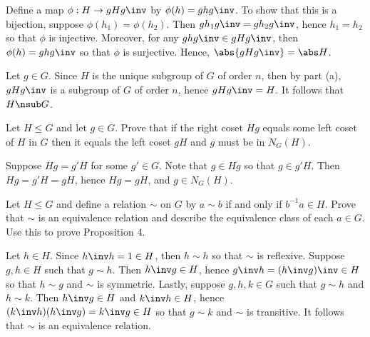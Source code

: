 \begin{problems}
\begin{solalph}
        Define a map $\phi : H \to gHg\inv$ by $\phi(h) = ghg\inv$. To show that this is a bijection, suppose $\phi(h_1) = \phi(h_2)$. Then $gh_1g\inv = gh_2g\inv$, hence $h_1 = h_2$ so that $\phi$ is injective. Moreover, for any $ghg\inv \in gHg\inv$, then $\phi(h) = ghg\inv$ so that $\phi$ is surjective. Hence, $\abs{gHg\inv} = \abs H$.
        \item Let $g \in G$. Since $H$ is the unique subgroup of $G$ of order $n$, then by part (a), $gHg\inv$ is a subgroup of $G$ of order $n$, hence $gHg\inv = H$. It follows that $H \nsub G$.
    \end{solalph}
    \item Let $H \leq G$ and let $g \in G$. Prove that if the right coset $Hg$ equals some left coset of $H$ in $G$ then it equals the left coset $gH$ and $g$ must be in $N_G(H)$.
    \begin{sol}
        Suppose $Hg = g'H$ for some $g' \in G$. Note that $g \in Hg$ so that $g \in g'H$. Then $Hg = g'H = gH$, hence $Hg = gH$, and $g \in N_G(H)$.
    \end{sol}
    \item Let $H \leq G$ and define a relation $\sim$ on $G$ by $a \sim b$ if and only if $b^{-1}a \in H$. Prove that $\sim$ is an equivalence relation and describe the equivalence class of each $a \in G$. Use this to prove Proposition 4.
    \begin{sol}
        Let $h \in H$. Since $h\inv h = 1 \in H$, then $h \sim h$ so that $\sim$ is reflexive. Suppose $g, h \in H$ such that $g \sim h$. Then $h\inv g \in H$, hence $g\inv h = (h\inv g)\inv \in H$ so that $h \sim g$ and $\sim$ is symmetric. Lastly, suppose $g, h, k \in G$ such that $g \sim h$ and $h \sim k$. Then $h\inv g \in H$ and $k\inv h \in H$, hence $(k\inv h)(h\inv g) = k\inv g \in H$ so that $g \sim k$ and $\sim$ is transitive. It follows that $\sim$ is an equivalence relation.


\end{sol}
\end{problems}
